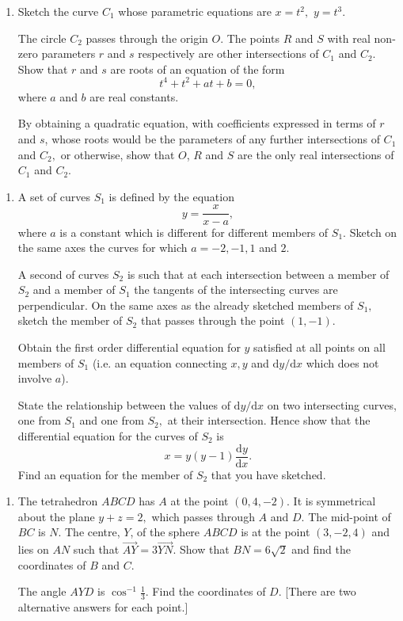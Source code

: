 \documentclass[a4, 11pt]{report}
\newlength{\qspace}
\newcounter{qnumber}
\newenvironment{question}%
 {\vspace{\qspace}
  \begin{enumerate}[\bfseries 1\quad][10]%
    \setcounter{enumi}{\value{qnumber}}%
    \item%
 }
{
  \end{enumerate}
  \filbreak
  \stepcounter{qnumber}
 }
\begin{document}
\begin{question}
Sketch the curve $C_{1}$ whose parametric equations are $x=t^{2},$
$y=t^{3}.$


The circle $C_{2}$ passes through the origin $O$. The points $R$
and $S$ with real non-zero parameters $r$ and $s$ respectively
are other intersections of $C_{1}$ and $C_{2}.$ Show that $r$ and
$s$ are roots of an equation of the form 
\[
t^{4}+t^{2}+at+b=0,
\]
where $a$ and $b$ are real constants. 


By obtaining a quadratic equation, with coefficients expressed in
terms of $r$ and $s$, whose roots would be the parameters of any
further intersections of $C_{1}$ and $C_{2},$ or otherwise, show
that $O$, $R$ and $S$ are the only real intersections of $C_{1}$
and $C_{2}.$  
\end{question}



\begin{question}
A set of curves $S_{1}$ is defined by the equation 
\[
y=\frac{x}{x-a},
\]
where $a$ is a constant which is different for different members
of $S_{1}.$ Sketch on the same axes the curves for which $a=-2,-1,1$
and $2$. 


A second of curves $S_{2}$ is such that at each intersection between
a member of $S_{2}$ and a member of $S_{1}$ the tangents of the
intersecting curves are perpendicular. On the same axes as the already
sketched members of $S_{1},$ sketch the member of $S_{2}$ that passes
through the point $(1,-1)$. 


Obtain the first order differential equation for $y$ satisfied at
all points on all members of $S_{1}$ (i.e. an equation connecting
$x,y$ and $\mathrm{d}y/\mathrm{d}x$ which does not involve $a$). 


State the relationship between the values of $\mathrm{d}y/\mathrm{d}x$
on two intersecting curves, one from $S_{1}$ and one from $S_{2},$
at their intersection. Hence show that the differential equation for
the curves of $S_{2}$ is 
\[
x=y(y-1)\dfrac{\mathrm{d}y}{\mathrm{d}x}.
\]
Find an equation for the member of $S_{2}$ that you have sketched.
\end{question}


\begin{question}
The tetrahedron $ABCD$ has $A$ at the point $(0,4,-2)$. It is symmetrical
about the plane $y+z=2,$ which passes through $A$ and $D$. The
mid-point of $BC$ is $N$. The centre, $Y$, of the sphere $ABCD$
is at the point $(3,-2,4)$ and lies on $AN$ such that $\overrightarrow{AY}=3\overrightarrow{YN}.$
Show that $BN=6\sqrt{2}$ and find the coordinates of $B$ and $C$. 


The angle $AYD$ is $\cos^{-1}\frac{1}{3}.$ Find the coordinates
of $D$. {[}There are two alternative answers for each point.{]}  
	\end{question}
	
\end{document}

